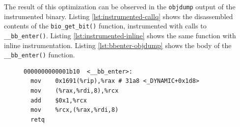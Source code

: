 The result of this optimization can be observed in the \verb|objdump| output of the instrumented binary. Listing \ref{lst:instrumented-callq} shows the disassembled contents of the \texttt{bio\_get\_bit()} function, instrumented with calls to \texttt{\_\_bb\_enter()}. Listing \ref{lst:instrumented-inline} shows the same function with inline instrumentation. Listing \ref{lst:bbenter-objdump} shows the body of the \texttt{\_\_bb\_enter()} function.



\begin{figure}[t]
    \centering
    \begin{minipage}[t]{.48\textwidth}  %
        \centering
        \begin{lstlisting}[caption={Disassembled object code of the \texttt{\_\_bb\_enter()} function.}, label={lst:bbenter-objdump}]
0000000000001b10  <__bb_enter>:
  mov    0x1691(%rip),%rax # 31a8 <_DYNAMIC+0x1d8>
  mov    (%rax,%rdi,8),%rcx
  add    $0x1,%rcx
  mov    %rcx,(%rax,%rdi,8)
  retq  
        \end{lstlisting}


\end{minipage}
\end{figure}
